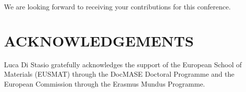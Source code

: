 \documentclass[12pt,a4paper]{article}
\begin{document}
We are looking forward to receiving your contributions for this conference.

\section*{ACKNOWLEDGEMENTS}

Luca Di Stasio gratefully acknowledges the support of the European School of Materials (EUSMAT) through the DocMASE Doctoral Programme and the European Commission through the Erasmus Mundus Programme.



%
%


\end{document}
